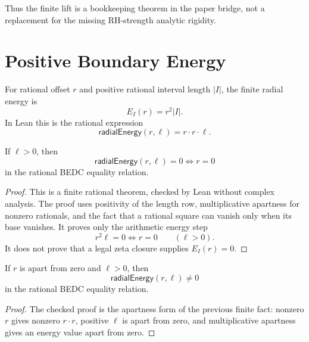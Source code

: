 Thus the finite lift is a bookkeeping theorem in the paper bridge, not a
replacement for the missing RH-strength analytic rigidity.

\section{Positive Boundary Energy}
\label{sec:rh-zeta-critical-unit-positive-boundary-energy}

\begin{definition}
\label{def:rh-zeta-critical-unit-radial-energy}
For rational offset $r$ and positive rational interval length $|I|$, the
finite radial energy is
$$
E_I(r)=r^2|I|.
$$
In Lean this is the rational expression
$$
\mathsf{radialEnergy}(r,\ell)
=
r\cdot r\cdot \ell.
$$
\end{definition}

\begin{theorem}
\label{thm:rh-zeta-critical-unit-radial-energy-zero-iff}
If $\ell>0$, then
$$
\mathsf{radialEnergy}(r,\ell)=0
\Longleftrightarrow
r=0
$$
in the rational BEDC equality relation.
\end{theorem}

\begin{proof}
This is a finite rational theorem, checked by Lean without complex
analysis. The proof uses positivity of the length row, multiplicative
apartness for nonzero rationals, and the fact that a rational square can
vanish only when its base vanishes. It proves only the arithmetic energy
step
$$
r^2\ell=0\Longleftrightarrow r=0
\qquad(\ell>0).
$$
It does not prove that a legal zeta closure supplies $E_I(r)=0$.
\end{proof}

\begin{theorem}
\label{thm:rh-zeta-critical-unit-radial-energy-nonzero}
If $r$ is apart from zero and $\ell>0$, then
$$
\mathsf{radialEnergy}(r,\ell)\neq 0
$$
in the rational BEDC equality relation.
\end{theorem}

\begin{proof}
The checked proof is the apartness form of the previous finite fact:
nonzero $r$ gives nonzero $r\cdot r$, positive $\ell$ is apart from zero,
and multiplicative apartness gives an energy value apart from zero.
\end{proof}

